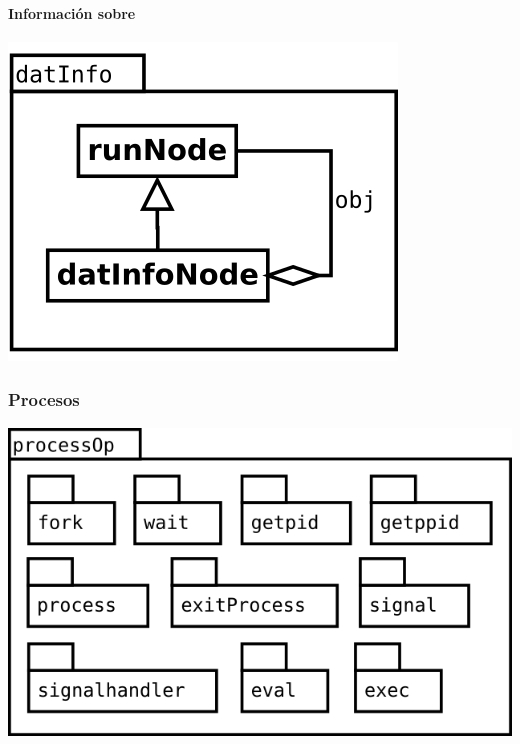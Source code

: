 \paragraph {Información sobre} 
\begin{center}
\includegraphics[scale=0.4]{datInfo.png} \\
\end{center}

\pagebreak
\subsubsection {Procesos} 
\begin{center}
\includegraphics[scale=0.4]{processOp-package.png} \\
\end{center}

